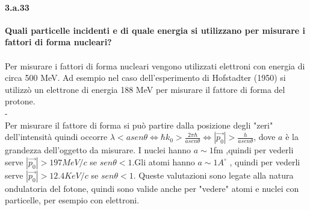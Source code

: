 \documentclass[twoside]{article}
\begin{document}
\paragraph{3.a.33}\textbf{Quali particelle incidenti e di quale energia si utilizzano per misurare i fattori di
forma nucleari?}\\ \\
Per misurare i fattori di forma nucleari vengono utilizzati elettroni con energia di circa 500 MeV. 
Ad esempio nel caso dell'esperimento di Hofstadter (1950) si utilizzò un elettrone di energia 188 MeV per misurare il fattore di forma del protone.\\
-
\\
Per misurare il fattore di forma si può partire dalla posizione degli "zeri" dell'intensità quindi occorre $\lambda < a  sen\theta \iff \hbar k_0>\frac{2\pi \hbar}{a sen\theta} \iff |\vec{p_0}|>\frac{h}{a sen\theta}$, dove $a$ è la grandezza dell'oggetto da misurare. I nuclei hanno $a \sim 1$fm ,quindi per vederli serve $|\vec{p_0}|>197 MeV/c$ se $sen\theta<1$.Gli atomi hanno $a \sim 1 A^{\circ}$ , quindi per vederli serve $|\vec{p_0}|>12.4 KeV/c$ se $sen\theta<1$. Queste valutazioni sono legate alla natura ondulatoria del fotone, quindi sono valide anche per "vedere" atomi e nuclei con particelle, per esempio con elettroni. 
\end{document}
